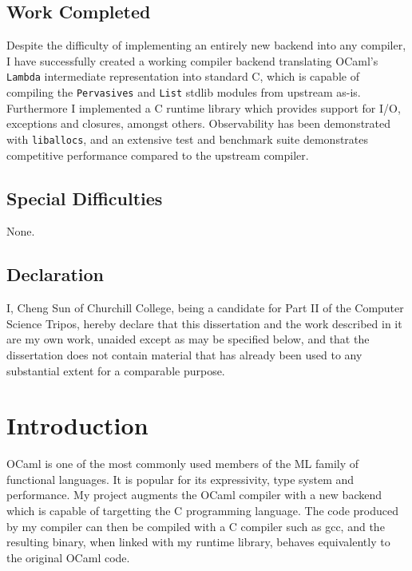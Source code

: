 \documentclass[12pt,a4paper,twoside,openright]{report}
\begin{document}
\section*{Work Completed}

Despite the difficulty of implementing an entirely new backend into any compiler,
I have successfully created a working compiler backend translating OCaml's
\lstinline!Lambda! intermediate representation into standard C, which is capable
of compiling the \lstinline!Pervasives! and \lstinline!List! stdlib modules from
upstream as-is. Furthermore I implemented a C runtime library which provides
support for I/O, exceptions and closures, amongst others. Observability has
been demonstrated with \lstinline!liballocs!, and an extensive test and
benchmark suite demonstrates competitive performance compared to the upstream
compiler.

\section*{Special Difficulties}

None.

\newpage
\section*{Declaration}

I, Cheng Sun of Churchill College, being a candidate for Part II of the Computer
Science Tripos, hereby declare
that this dissertation and the work described in it are my own work,
unaided except as may be specified below, and that the dissertation
does not contain material that has already been used to any substantial
extent for a comparable purpose.

\bigskip
{}

\medskip
{}

\tableofcontents

\newpage

\pagestyle{headings}

\chapter{Introduction}

OCaml is one of the most commonly used members of the ML family of functional
languages. It is popular for its expressivity, type system and performance.
My project augments the OCaml compiler with a new backend which is capable of
targetting the C programming language. The code produced by my compiler can
then be compiled with a C compiler such as gcc, and the resulting binary, when
linked with my runtime library, behaves equivalently to the original OCaml code.
\end{document}
